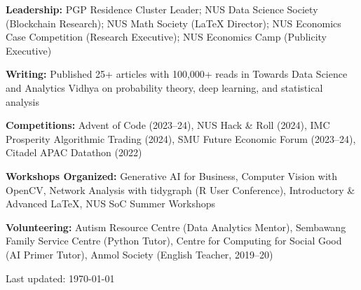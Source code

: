 \documentclass[10pt,a4paper]{article}
\begin{document}
\textbf{Leadership:} PGP Residence Cluster Leader; NUS Data Science Society (Blockchain Research); NUS Math Society (LaTeX Director); NUS Economics Case Competition (Research Executive); NUS Economics Camp (Publicity Executive)

\vspace{3pt}

\textbf{Writing:} Published 25+ articles with 100,000+ reads in Towards Data Science and Analytics Vidhya on probability theory, deep learning, and statistical analysis

\vspace{3pt}

\textbf{Competitions:} Advent of Code (2023--24), NUS Hack \& Roll (2024), IMC Prosperity Algorithmic Trading (2024), SMU Future Economic Forum (2023--24), Citadel APAC Datathon (2022)

\vspace{3pt}

\textbf{Workshops Organized:} Generative AI for Business, Computer Vision with OpenCV, Network Analysis with tidygraph (R User Conference), Introductory \& Advanced \LaTeX, NUS SoC Summer Workshops

\vspace{3pt}

\textbf{Volunteering:} Autism Resource Centre (Data Analytics Mentor), Sembawang Family Service Centre (Python Tutor), Centre for Computing for Social Good (AI Primer Tutor), Anmol Society (English Teacher, 2019--20)

\vspace{8pt}
\begin{center}
\footnotesize\textcolor{secondary}{Last updated: \today}
\end{center}
\end{document}
